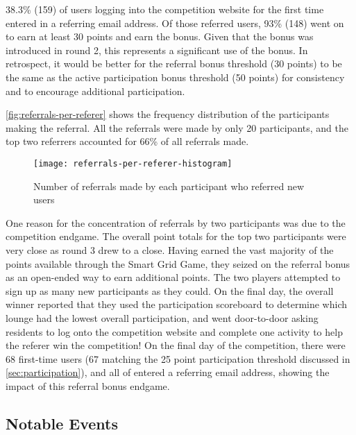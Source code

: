 38.3\% (159) of users logging into the competition website for the first time entered in a referring email address. Of those referred users, 93\% (148) went on to earn at least 30 points and earn the bonus. Given that the bonus was introduced in round 2, this represents a significant use of the bonus. In retrospect, it would be better for the referral bonus threshold (30 points) to be the same as the active participation bonus threshold (50 points) for consistency and to encourage additional participation.

\autoref{fig:referrals-per-referer} shows the frequency distribution of the participants making the referral. All the referrals were made by only 20 participants, and the top two referrers accounted for 66\% of all referrals made.

\begin{figure}[htbp]
	\centering
		\texttt{[image: referrals-per-referer-histogram]}
		\caption{Number of referrals made by each participant who referred new users}
\label{fig:referrals-per-referer}
\end{figure}

One reason for the concentration of referrals by two participants was due to the competition endgame. The overall point totals for the top two participants were very close as round 3 drew to a close. Having earned the vast majority of the points available through the Smart Grid Game, they seized on the referral bonus as an open-ended way to earn additional points. The two players attempted to sign up as many new participants as they could. On the final day, the overall winner reported that they used the participation scoreboard to determine which lounge had the lowest overall participation, and went door-to-door asking residents to log onto the competition website and complete one activity to help the referer win the competition! On the final day of the competition, there were 68 first-time users (67 matching the 25 point participation threshold discussed in \autoref{sec:participation}), and all of entered a referring email address, showing the impact of this referral bonus endgame.

\subsection{Notable Events}



